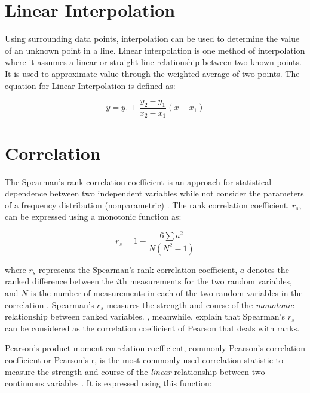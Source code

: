 \section{Linear Interpolation}
Using surrounding data points, interpolation can be used to determine the value of an unknown point in a line. Linear interpolation is one method of interpolation where it assumes a linear or straight line relationship between two known points. It is used to approximate value through the weighted average of two points. The equation for Linear Interpolation is defined as:

\begin {equation}
y = y_1 + \frac{y_2 - y_1}{x_2 - x_1} (x - x_1)
\end{equation}



\section{Correlation}
The Spearman's rank correlation coefficient is an approach for statistical dependence between two independent variables while not consider the parameters of a frequency distribution (nonparametric) . The rank correlation coefficient, $r_s$, can be expressed using a monotonic function as: 

\begin {equation}
r_s = 1 - \frac{6 \sum a^2}{N(N^2 - 1)}
\end{equation}

\noindent where $r_s$  represents the Spearman’s rank correlation coefficient, $a$ denotes the ranked difference between the $i$th measurements for the two random variables, and $N$ is the number of measurements in each of the two random variables in the correlation . Spearman’s $r_s$ measures the strength and course of the \textit{monotonic} relationship between ranked variables. , meanwhile, explain that Spearman’s $r_s$ can be considered as the correlation coefficient of Pearson that deals with ranks.  

Pearson’s product moment correlation coefficient, commonly Pearson’s correlation coefficient or Pearson’s r, is the most commonly used correlation statistic to measure the strength and course of the \textit{linear} relationship between two continuous variables . It is expressed using this function:

